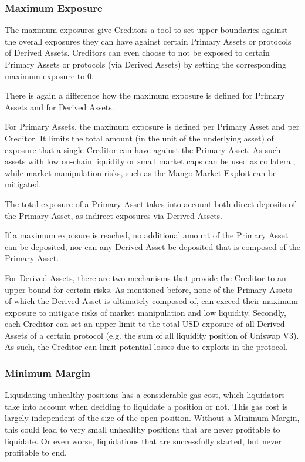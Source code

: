 \documentclass[sigconf,nonacm]{acmart}
\begin{document}
\subsubsection{Maximum Exposure}
The maximum exposures give Creditors a tool to set upper boundaries against the overall exposures they can have against certain Primary Assets or protocols of Derived Assets.
Creditors can even choose to not be exposed to certain Primary Assets or protocols (via Derived Assets) by setting the corresponding maximum exposure to 0.

There is again a difference how the maximum exposure is defined for Primary Assets and for Derived Assets.

For Primary Assets, the maximum exposure is defined per Primary Asset and per Creditor.
It limits the total amount (in the unit of the underlying asset) of exposure that a single Creditor can have against the Primary Asset.
As such assets with low on-chain liquidity or small market caps can be used as collateral,
while market manipulation risks, such as the Mango Market Exploit\cite{coindeskDeFiExchange} can be mitigated.

The total exposure of a Primary Asset takes into account both direct deposits of the Primary Asset, as indirect exposures via Derived Assets.

If a maximum exposure is reached, no additional amount of the Primary Asset can be deposited,
nor can any Derived Asset be deposited that is composed of the Primary Asset.

For Derived Assets, there are two mechanisms that provide the Creditor to an upper bound for certain risks.
As mentioned before, none of the Primary Assets of which the Derived Asset is ultimately composed of, can exceed their maximum exposure to mitigate risks of market manipulation and low liquidity.
Secondly, each Creditor can set an upper limit to the total USD exposure of all Derived Assets of a certain protocol (e.g. the sum of all liquidity position of Uniswap V3).
As such, the Creditor can limit potential losses due to exploits in the protocol.

\subsubsection{Minimum Margin}
\label{subsubsec:minimum-margin}
Liquidating unhealthy positions has a considerable gas cost, which liquidators take into account when deciding to liquidate a position or not.
This gas cost is largely independent of the size of the open position.
Without a Minimum Margin, this could lead to very small unhealthy positions that are never profitable to liquidate.
Or even worse, liquidations that are successfully started, but never profitable to end.
\end{document}
